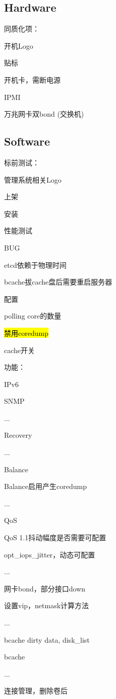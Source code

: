 \subsection{Hardware}

同质化项：
\begin{enumbox}
\item 开机Logo
\item 贴标
\item 开机卡，需断电源
\item IPMI
\item 万兆网卡双bond (交换机)
\end{enumbox}

\subsection{Software}

标前测试：
\begin{enumbox}
\item 管理系统相关Logo
\item 上架
\item 安装
\item 性能测试
\end{enumbox}

BUG
\begin{enumbox}
\item etcd依赖于物理时间
\item bcache拔cache盘后需要重启服务器
\end{enumbox}

配置
\begin{enumbox}
\item polling core的数量
\item \hl{禁用coredump}
\item cache开关
\end{enumbox}

功能：
\begin{enumbox}
\item IPv6
\item SNMP
\item ...
\item Recovery
\item ...
\item Balance
\item Balance启用产生coredump
\item ...
\item QoS
\item QoS 1.1抖动幅度是否需要可配置
\item opt\_iops\_jitter，动态可配置
\item ...
\item 网卡bond，部分接口down
\item 设置vip，netmask计算方法
\item ...
\item bcache dirty data, disk\_list
\item bcache
\item ...
\item 连接管理，删除卷后
\end{enumbox}

